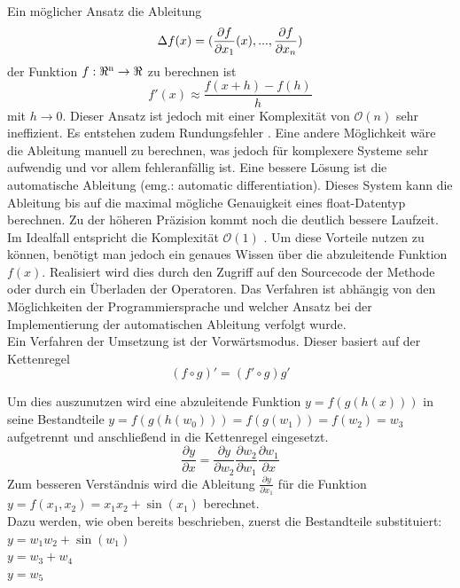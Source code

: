 \documentclass{like}
\begin{document}
Ein möglicher Ansatz die Ableitung 
\begin{equation}
	\Delta{\tiny } f(x) = (\frac{\partial f}{\partial x_1} (x), ..., \frac{\partial f}{\partial x_n})
\end{equation}
der Funktion $f:\Re \textsuperscript{n} \rightarrow \Re $ zu berechnen ist \\
\begin{equation}
	f'(x) \approx \frac{f(x+h) - f(h)}{h}
\end{equation}
 mit $ h \rightarrow 0$.
Dieser Ansatz ist jedoch mit einer Komplexität von $\mathcal{O}(n)$ sehr ineffizient. Es entstehen zudem Rundungsfehler \cite{julDiff}.
Eine andere Möglichkeit wäre die Ableitung manuell zu berechnen, was jedoch für komplexere Systeme sehr aufwendig und vor allem fehleranfällig ist. Eine bessere Lösung ist die automatische Ableitung (emg.: automatic differentiation). 
Dieses System kann die Ableitung bis auf die maximal mögliche Genauigkeit eines float-Datentyp berechnen. Zu der höheren Präzision kommt noch die deutlich bessere Laufzeit. Im Idealfall entspricht die Komplexität $\mathcal{O}(1)$ \cite{julDiff}. Um diese Vorteile nutzen zu können, benötigt man jedoch ein genaues Wissen über die abzuleitende Funktion \(f(x)\). Realisiert wird dies durch den Zugriff auf den Sourcecode der Methode oder durch ein Überladen der Operatoren. Das Verfahren ist abhängig von den Möglichkeiten der Programmiersprache und welcher Ansatz bei der Implementierung der automatischen Ableitung verfolgt wurde. \\

Ein Verfahren der Umsetzung ist der Vorwärtsmodus. Dieser basiert auf der Kettenregel 
\begin{equation}
	(f \circ g)' = (f' \circ g)g'
\end{equation}

Um dies auszunutzen wird eine abzuleitende Funktion $ y = f(g(h(x)))$ in seine Bestandteile $y = f(g(h(w_0))) = f(g(w_1)) = f(w_2) = w_3$ aufgetrennt und anschließend in die Kettenregel eingesetzt. 
\begin{equation}
\frac{\partial y}{\partial x} = \frac{\partial y}{\partial w_2} \frac{\partial w_2}{\partial w_1} \frac{\partial w_1}{\partial x}
\end{equation}
Zum besseren Verständnis wird die Ableitung $\frac{\partial y}{\partial x_1}$ für die Funktion
$y = f(x_1, x_2) = x_1x_2 + \sin(x_1)$  berechnet.\\
Dazu werden, wie oben bereits beschrieben, zuerst die Bestandteile substituiert:\\
$y = w_1w_2 + \sin(w_1) $ \\
$y = w_3 + w_4$ \\
$y = w_5$
\end{document}
